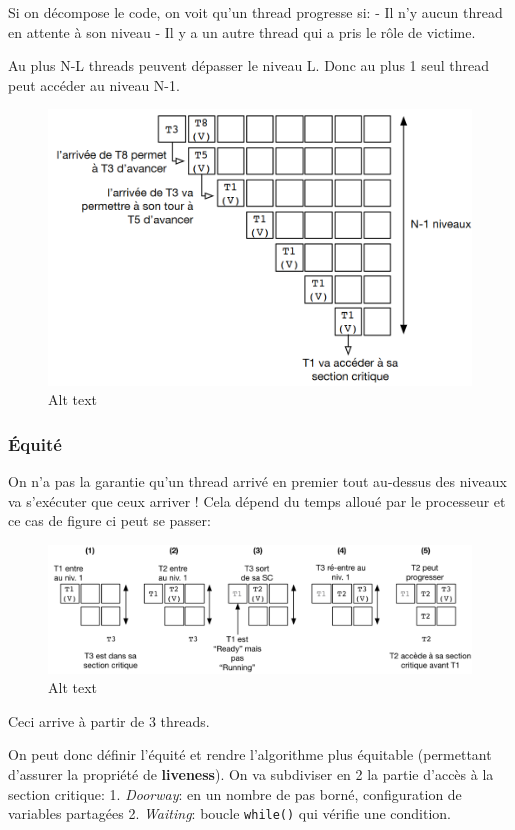 Si on décompose le code, on voit qu'un thread progresse si: - Il n'y
aucun thread en attente à son niveau - Il y a un autre thread qui a pris
le rôle de victime.

Au plus N-L threads peuvent dépasser le niveau L. Donc au plus 1 seul
thread peut accéder au niveau N-1.

\begin{figure}
\centering
\includegraphics{image-26.png}
\caption{Alt text}
\end{figure}

\subsubsection{Équité}\label{uxe9quituxe9}

On n'a pas la garantie qu'un thread arrivé en premier tout au-dessus des
niveaux va s'exécuter que ceux arriver ! Cela dépend du temps alloué par
le processeur et ce cas de figure ci peut se passer:

\begin{figure}
\centering
\includegraphics{image-27.png}
\caption{Alt text}
\end{figure}

Ceci arrive à partir de 3 threads.

On peut donc définir l'équité et rendre l'algorithme plus équitable
(permettant d'assurer la propriété de \textbf{liveness}). On va
subdiviser en 2 la partie d'accès à la section critique: 1.
\emph{Doorway}: en un nombre de pas borné, configuration de variables
partagées 2. \emph{Waiting}: boucle \texttt{while()} qui vérifie une
condition.

